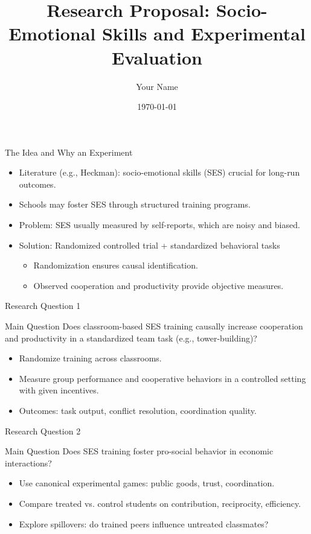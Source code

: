 \documentclass{beamer}
\title{Research Proposal: Socio-Emotional Skills and Experimental Evaluation}
\author{Your Name}
\date{\today}
\begin{document}
\frame{\titlepage}

\begin{frame}{The Idea and Why an Experiment}
    \begin{itemize}
        \item Literature (e.g., Heckman): socio-emotional skills (SES) crucial for long-run outcomes.
        \item Schools may foster SES through structured training programs.
        \item Problem: SES usually measured by self-reports, which are noisy and biased.
        \item Solution: Randomized controlled trial + standardized behavioral tasks
            \begin{itemize}
                \item Randomization ensures causal identification.
                \item Observed cooperation and productivity provide objective measures.
            \end{itemize}
    \end{itemize}
\end{frame}

\begin{frame}{Research Question 1}
    \begin{block}{Main Question}
        Does classroom-based SES training causally increase cooperation and productivity in a standardized team task (e.g., tower-building)?
    \end{block}
    \begin{itemize}
        \item Randomize training across classrooms.
        \item Measure group performance and cooperative behaviors in a controlled setting with given incentives. 
        \item Outcomes: task output, conflict resolution, coordination quality.
    \end{itemize}
\end{frame}

\begin{frame}{Research Question 2}
    \begin{block}{Main Question}
        Does SES training foster pro-social behavior in economic interactions?
    \end{block}
    \begin{itemize}
        \item Use canonical experimental games: public goods, trust, coordination.
        \item Compare treated vs. control students on contribution, reciprocity, efficiency.
        \item Explore spillovers: do trained peers influence untreated classmates?
    \end{itemize}
\end{frame}
\end{document}
